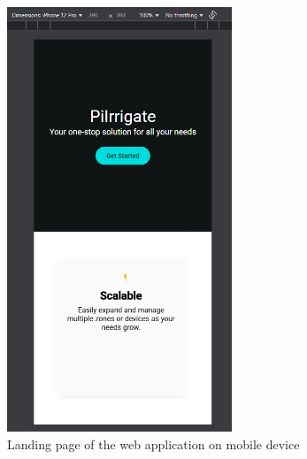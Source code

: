 \begin{figure}[H]
    \centering
    \includegraphics[width=0.6\textwidth]{images/landing_12_pro.png}
    \caption{Landing page of the web application on mobile device}
    \label{fig:landing-page-mobile}
\end{figure}

